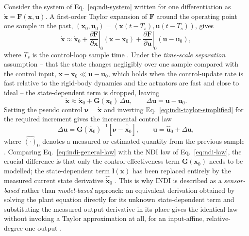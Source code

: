 \documentclass{article}
\begin{document}
Consider the system of Eq.~\eqref{eq:ndi-system} written for one differentiation as $\dot{\mathbf{x}}=\mathbf{F}(\mathbf{x},\mathbf{u})$. A first-order Taylor expansion of $\mathbf{F}$ around the operating point one sample in the past, $(\mathbf{x}_0,\mathbf{u}_0)=(\mathbf{x}(t-T_s),\mathbf{u}(t-T_s))$, gives
\begin{equation}
    \dot{\mathbf{x}}\approx\dot{\mathbf{x}}_0
    +\left.\frac{\partial\mathbf{F}}{\partial\mathbf{x}}\right|_{0}\!\!(\mathbf{x}-\mathbf{x}_0)
    +\left.\frac{\partial\mathbf{F}}{\partial\mathbf{u}}\right|_{0}\!\!(\mathbf{u}-\mathbf{u}_0),
    \label{eq:taylor}
\end{equation}
where $T_s$ is the control-loop sample time \citep{bacon2000,steinertPart1_2025}. Under the \emph{time-scale separation} assumption -- that the state changes negligibly over one sample compared with the control input, $\mathbf{x}-\mathbf{x}_0\ll\mathbf{u}-\mathbf{u}_0$, which holds when the control-update rate is fast relative to the rigid-body dynamics and the actuators are fast and close to ideal \citep{bacon2000,sieberling2010} -- the state-dependent term is dropped, leaving
\begin{equation}
    \dot{\mathbf{x}}\approx\dot{\mathbf{x}}_0+\mathbf{G}(\mathbf{x}_0)\,\Delta\mathbf{u},\qquad \Delta\mathbf{u}=\mathbf{u}-\mathbf{u}_0.
    \label{eq:indi-taylor-simplified}
\end{equation}
Setting the pseudo control $\boldsymbol{\nu}=\dot{\mathbf{x}}$ and inverting Eq.~\eqref{eq:indi-taylor-simplified} for the required increment gives the incremental control law
\begin{equation}
    \Delta\mathbf{u}=\mathbf{G}(\hat{\mathbf{x}}_0)^{-1}\left[\boldsymbol{\nu}-\hat{\dot{\mathbf{x}}}_0\right],\qquad
    \mathbf{u}=\hat{\mathbf{u}}_0+\Delta\mathbf{u},
    \label{eq:indi-general-law}
\end{equation}
where $\hat{(\cdot)}_0$ denotes a measured or estimated quantity from the previous sample \citep{bacon2000,steinertPart1_2025}. Comparing Eq.~\eqref{eq:indi-general-law} with the NDI law of Eq.~\eqref{eq:ndi-law}, the crucial difference is that only the control-effectiveness term $\mathbf{G}(\mathbf{x}_0)$ needs to be modelled; the state-dependent term $\mathbf{l}(\mathbf{x})$ has been replaced entirely by the measured current state derivative $\hat{\dot{\mathbf{x}}}_0$ \citep{steinertPart1_2025}. This is why INDI is described as a \emph{sensor-based} rather than \emph{model-based} approach: an equivalent derivation obtained by solving the plant equation directly for its unknown state-dependent term and substituting the measured output derivative in its place gives the identical law without invoking a Taylor approximation at all, for an input-affine, relative-degree-one output \citep{steinertPart1_2025}.
\end{document}
